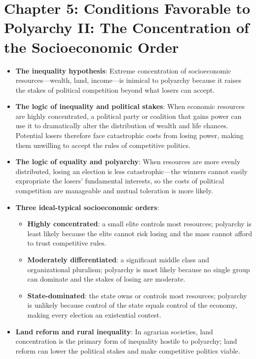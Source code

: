 \documentclass[12pt]{article}
\begin{document}
\section{Chapter 5: Conditions Favorable to Polyarchy II: The Concentration of the Socioeconomic Order}

\begin{itemize}[leftmargin=*, itemsep=4pt]
    \item \textbf{The inequality hypothesis}: Extreme concentration of socioeconomic resources---wealth, land, income---is inimical to polyarchy because it raises the stakes of political competition beyond what losers can accept.
    \item \textbf{The logic of inequality and political stakes}: When economic resources are highly concentrated, a political party or coalition that gains power can use it to dramatically alter the distribution of wealth and life chances. Potential losers therefore face catastrophic costs from losing power, making them unwilling to accept the rules of competitive politics.
    \item \textbf{The logic of equality and polyarchy}: When resources are more evenly distributed, losing an election is less catastrophic---the winners cannot easily expropriate the losers' fundamental interests, so the costs of political competition are manageable and mutual toleration is more likely.
    \item \textbf{Three ideal-typical socioeconomic orders}:
        \begin{itemize}
            \item \textbf{Highly concentrated}: a small elite controls most resources; polyarchy is least likely because the elite cannot risk losing and the mass cannot afford to trust competitive rules.
            \item \textbf{Moderately differentiated}: a significant middle class and organizational pluralism; polyarchy is most likely because no single group can dominate and the stakes of losing are moderate.
            \item \textbf{State-dominated}: the state owns or controls most resources; polyarchy is unlikely because control of the state equals control of the economy, making every election an existential contest.
        \end{itemize}
    \item \textbf{Land reform and rural inequality}: In agrarian societies, land concentration is the primary form of inequality hostile to polyarchy; land reform can lower the political stakes and make competitive politics viable.

\end{itemize}
\end{document}
